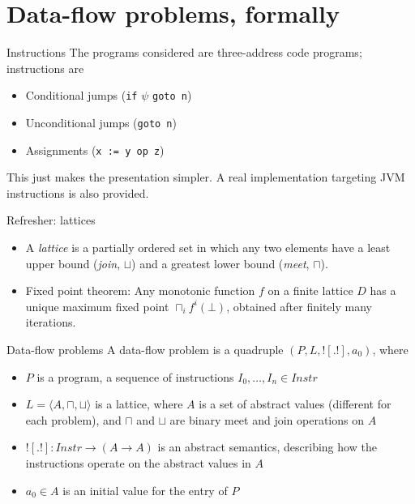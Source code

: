 \documentclass{beamer}
\begin{document}
\section{Data-flow problems, formally}
\begin{frame}{Instructions}
The programs considered are three-address code programs; instructions are
\begin{itemize}
\item Conditional jumps ({\tt if} $\psi$ {\tt goto n})
\item Unconditional jumps ({\tt goto n})
\item Assignments ({\tt x := y op z})
\end{itemize}
This just makes the presentation simpler. A real implementation
targeting JVM instructions is also provided.
\end{frame}     

\begin{frame}{Refresher: lattices}
\begin{itemize}
\item A \emph{lattice} is a partially ordered set in which any two 
elements have a least upper bound (\emph{join}, $\sqcup$) and a greatest
lower bound (\emph{meet}, $\sqcap$).
\item Fixed point theorem: Any monotonic function $f$ on a finite lattice 
$D$ has a unique maximum fixed point $\sqcap_i f^i(\bot)$, obtained after
finitely many iterations.
\end{itemize}
\end{frame}
 
\begin{frame}{Data-flow problems}
A data-flow problem is a quadruple $(P, L, ![.!], a_0)$, where
\begin{itemize}
\item $P$ is a program, a sequence of instructions $I_0,\dots,I_n \in 
Instr$
\item $L = \langle A, \sqcap, \sqcup \rangle$ is a lattice, where $A$ is
a set of abstract values (different for each problem), and $\sqcap$ and 
$\sqcup$ are binary meet and join operations on $A$
\item $![.!] : Instr \rightarrow (A \rightarrow A)$ is an abstract
semantics, describing how the instructions operate on the abstract values
in $A$
\item $a_0 \in A$ is an initial value for the entry of $P$
\end{itemize}
\end{frame}
\end{document}
